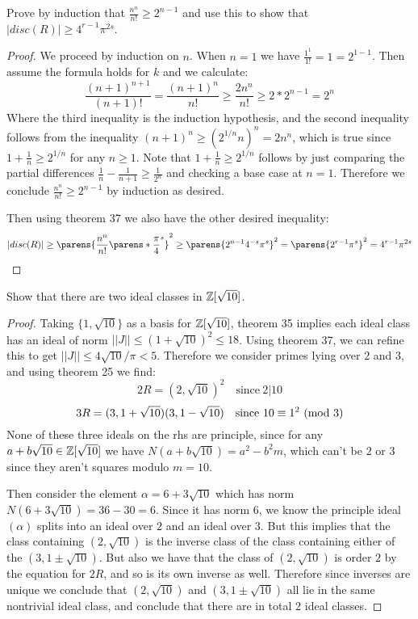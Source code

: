 \documentclass[11pt]{article}
\begin{document}
Prove by induction that $\frac{n^n}{n!} \ge 2^{n-1}$ and use this to show that $|disc(R)| \ge 4^{r-1}\pi^{2s}$.
\begin{proof}
  We proceed by induction on $n$. When $n = 1$ we have $\frac{1^1}{1!} = 1 = 2^{1-1}$. Then assume the formula holds for $k$ and we calculate:
  \begin{equation*}
    \frac{(n+1)^{n+1}}{(n+1)!} = \frac{(n+1)^n}{n!} \ge \frac{2n^n}{n!} \ge 2*2^{n-1} = 2^n
  \end{equation*}
  Where the third inequality is the induction hypothesis, and the second inequality follows from the inequality $(n+1)^n \ge (2^{1/n}n)^n = 2n^n$, which is true since $1 + \frac{1}{n} \ge 2^{1/n}$ for any $n \ge 1$. Note that $1 + \frac{1}{n} \ge 2^{1/n}$ follows by just comparing the partial differences $\frac{1}{n} - \frac{1}{n+1} \ge \frac{1}{2^n}$ and checking a base case at $n=1$. Therefore we conclude $\frac{n^n}{n!} \ge 2^{n-1}$ by induction as desired.

  Then using theorem 37 we also have the other desired inequality:
  \begin{equation*}
    |disc(R)| \ge \parens{\frac{n^n}{n!}\parens*{\frac{\pi}{4}}^s}^2 \ge \parens{2^{n-1}4^{-s}\pi^s}^2 = \parens{2^{r-1}\pi^s}^2 = 4^{r-1}\pi^{2s}
  \end{equation*}
\end{proof}


Show that there are two ideal classes in $\mathbb{Z}[\sqrt{10}]$.
\begin{proof}
  Taking $\{1,\sqrt{10}\}$ as a basis for $\mathbb{Z}[\sqrt{10}]$, theorem 35 implies each ideal class has an ideal of norm $||J|| \le (1 + \sqrt{10})^2 \le 18$. Using theorem 37, we can refine this to get $||J|| \le 4\sqrt{10}/\pi < 5$. Therefore we consider primes lying over $2$ and $3$, and using theorem 25 we find:
  $$2R = (2, \sqrt{10})^2 \quad \text{since}\ 2 | 10$$
  $$3R = (3, 1+\sqrt{10})(3, 1-\sqrt{10}) \quad \text{since}\ 10 \equiv 1^2\ (\text{mod}\ 3) $$
  None of these three ideals on the rhs are principle, since for any $a + b\sqrt{10} \in \mathbb{Z}[\sqrt{10}]$ we have $N(a + b\sqrt{10}) = a^2 - b^2m$, which can't be $2$ or $3$ since they aren't squares modulo $m = 10$.

  Then consider the element $\alpha = 6 + 3\sqrt{10}$ which has norm $N(6 + 3\sqrt{10}) = 36 - 30 = 6$.
  Since it has norm $6$, we know the principle ideal $(\alpha)$ splits into an ideal over $2$ and an ideal over $3$.
  But this implies that the class containing $(2, \sqrt{10})$ is the inverse class of the class containing either of the $(3, 1 \pm \sqrt{10})$. But also we have that the class of $(2, \sqrt{10})$ is order $2$ by the equation for $2R$, and so is its own inverse as well.
  Therefore since inverses are unique we conclude that $(2, \sqrt{10})$ and $(3, 1 \pm \sqrt{10})$ all lie in the same nontrivial ideal class, and conclude that there are in total $2$ ideal classes.
\end{proof}
\end{document}
